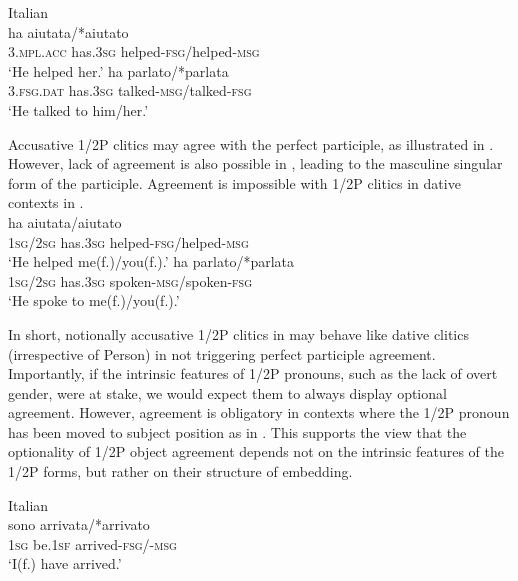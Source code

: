 \documentclass[output=paper,colorlinks,citecolor=brown]{./langscibook}
\begin{document}
\ea%
    \label{ex:manzini:14}
    Italian\\
    \ea\label{ex:manzini:14a} 
         {ha}     {aiutata/*aiutato}\\
        \textsc{3.mpl.acc}  has.\textsc{3sg}    helped-\textsc{fsg/}helped\textsc{{}-msg}\\
    \glt ‘He helped her.’
    \ex\label{ex:manzini:14b} 
           {ha}     {parlato/*parlata}\\
        \textsc{3.fsg.dat}  has.\textsc{3sg}    talked-\textsc{msg/}talked\textsc{{}-fsg}\\
    \glt ‘He talked to him/her.’
    \z
\z
 
Accusative 1/2P clitics may agree with the perfect participle, as illustrated in . However, lack of agreement is also possible in , leading to the masculine singular form of the participle. Agreement is impossible with 1/2P clitics in dative contexts in .\\

\ea%
    \label{ex:manzini:15}
    \ea\label{ex:manzini:15a} 
         {ha}     {aiutata/aiutato}\\
        \textsc{1sg/2sg}  has\textsc{.3sg}    helped\textsc{{}-fsg/}helped\textsc{{}-msg}\\
    \glt ‘He helped me(f.)/you(f.).’
\ex\label{ex:manzini:15b} 
            {ha}     {parlato/*parlata}\\
        \textsc{1sg/2sg}  has\textsc{.3sg}    spoken\textsc{{}-msg/}spoken\textsc{{}-fsg}\\
    \glt ‘He spoke to me(f.)/you(f.).’
    \z
\z 

In short, notionally accusative 1/2P clitics in  may behave like dative clitics (irrespective of Person) in not triggering perfect participle agreement. Importantly, if the intrinsic features of 1/2P pronouns, such as the lack of overt gender, were at stake, we would expect them to always display optional agreement. However, agreement is obligatory in contexts where the 1/2P pronoun has been moved to subject position as in . This supports the view that the optionality of 1/2P object agreement depends not on the intrinsic features of the 1/2P forms, but rather on their structure of embedding.

\ea%
    \label{ex:manzini:16}
    Italian\\
      {sono}     {arrivata/*arrivato}\\
        \textsc{1sg}  be.\textsc{1sf}   arrived\textsc{{}-fsg/-msg}\\
    \glt ‘I(f.) have arrived.’
\z
\end{document}
